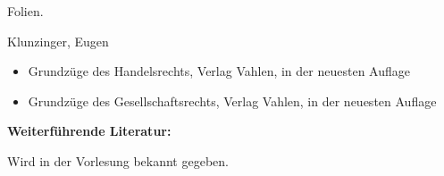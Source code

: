 \begin{course}
\begin{content}
\end{content}

\begin{media}Folien.

\end{media}

\begin{literature}Klunzinger, Eugen

 \begin{itemize}\item Grundzüge des Handelsrechts, Verlag Vahlen, in der neuesten Auflage   \item Grundzüge des Gesellschaftsrechts, Verlag Vahlen, in der neuesten Auflage  \end{itemize}

\textbf{Weiterführende Literatur:}

 

Wird in der Vorlesung bekannt gegeben.

\end{literature}



\end{course}